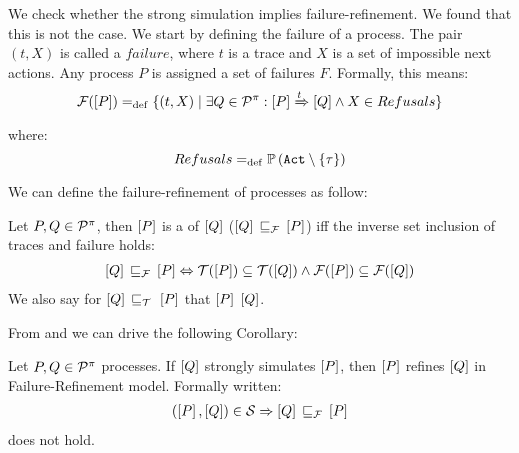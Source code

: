 We check whether the strong simulation implies failure-refinement. We found that this is not the case. We start by defining the failure of a process.
The pair $(t, X)$ is called a $failure$, where $t$ is a trace and $X$ is a set of impossible next actions. Any process
$P$ is assigned a set of failures $F$. Formally, this means:
\begin{align}
    \failures[P] \define \{(t,X) \mid \exists Q\in\procs: \ec{P} \bigstep{t} \ec{Q}\wedge X\in Refusals\}
\label{failure}
\end{align}
where: \[Refusals \define \pom{\actions\setminus\set{\tau}}\]

We can define the failure-refinement of \picalc{} processes as follow:

\begin{definition}
\label{def_failure_ref}
	Let $P,Q\in\mathcal P^{\pi}$, then $\left[P\right]$ is a  of $\left[Q\right]$ ($\ec{Q}\refiF \ec{P}$) iff the inverse set inclusion of traces and failure holds:
\begin{align}
   \ec{Q} \refiF \ec{P} \Leftrightarrow  \traces[P]\subseteq\traces[Q] \wedge \failures[P]\subseteq\failures[Q]
\end{align}
	We also say for $\ec{Q}\refi{}\ec{P}$ that $\left[P\right]$  $\left[Q\right]$.
\end{definition}

From  and  we can drive the following Corollary: 

\begin{cor}
\label{cor_sim_failure_refinement}
Let $P,Q\in\mathcal P^{\pi}$ processes. If $\left[Q\right]$ strongly simulates $\left[P\right]$, then $\left[P\right]$ refines $\left[Q\right]$ in Failure-Refinement model. Formally written:
\begin{align}
    (\ec{P},\ec{Q})\in{}\simu  \Rightarrow \ec{Q} \refiF \ec{P}
   \label{failure_model}
\end{align}
does not hold.
\end{cor}%

